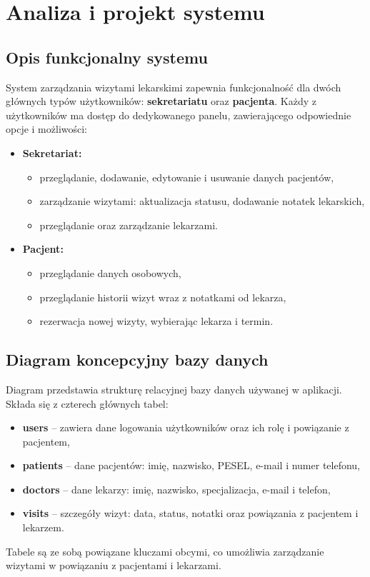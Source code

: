 \chapter{Analiza i projekt systemu}

\section{Opis funkcjonalny systemu}
System zarządzania wizytami lekarskimi zapewnia funkcjonalność dla dwóch głównych typów użytkowników: \textbf{sekretariatu} oraz \textbf{pacjenta}. Każdy z użytkowników ma dostęp do dedykowanego panelu, zawierającego odpowiednie opcje i możliwości:

\begin{itemize}
  \item \textbf{Sekretariat:}
  \begin{itemize}
    \item przeglądanie, dodawanie, edytowanie i usuwanie danych pacjentów,
    \item zarządzanie wizytami: aktualizacja statusu, dodawanie notatek lekarskich,
    \item przeglądanie oraz zarządzanie lekarzami.
  \end{itemize}

  \item \textbf{Pacjent:}
  \begin{itemize}
    \item przeglądanie danych osobowych,
    \item przeglądanie historii wizyt wraz z notatkami od lekarza,
    \item rezerwacja nowej wizyty, wybierając lekarza i termin.
  \end{itemize}
\end{itemize}

\section{Diagram koncepcyjny bazy danych}

Diagram przedstawia strukturę relacyjnej bazy danych używanej w aplikacji. Składa się z czterech głównych tabel:
\begin{itemize}
    \item \textbf{users} – zawiera dane logowania użytkowników oraz ich rolę i powiązanie z pacjentem,
    \item \textbf{patients} – dane pacjentów: imię, nazwisko, PESEL, e-mail i numer telefonu,
    \item \textbf{doctors} – dane lekarzy: imię, nazwisko, specjalizacja, e-mail i telefon,
    \item \textbf{visits} – szczegóły wizyt: data, status, notatki oraz powiązania z pacjentem i lekarzem.
\end{itemize}
Tabele są ze sobą powiązane kluczami obcymi, co umożliwia zarządzanie wizytami w powiązaniu z pacjentami i lekarzami.

